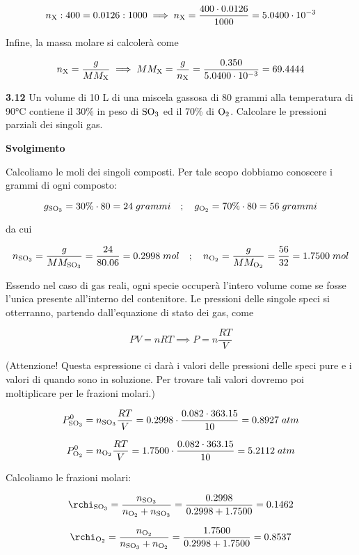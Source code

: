 $$n_{\rm X}:400=0.0126:1000
\implies
n_{\rm X}=\frac{400 \cdot 0.0126}{1000}
=5.0400 \cdot 10^{-3}$$

Infine, la massa molare si calcolerà come

$$n_{\rm X}=\frac{g}{MM_{\rm X}}
\implies
MM_{\rm X}=\frac{g}{n_{\rm X}}=\frac{0.350}{5.0400 \cdot 10^{-3}}=69.4444$$

\vspace{0.2cm}\textbf{3.12} Un volume di 10 L di una miscela gassosa di 80 grammi alla temperatura di 90°C contiene il
30\% in peso di $\rm SO_3$ ed il 70\% di $\rm O_2$. Calcolare le pressioni parziali dei singoli gas.

\vspace{0.2cm}\large\textbf{Svolgimento}\normalsize

\vspace{0.2cm}Calcoliamo le moli dei singoli composti. Per tale scopo dobbiamo conoscere i grammi di ogni composto:

$$g_{\rm SO_3}=30\% \cdot 80=24\;grammi
\quad;\quad
g_{\rm O_2}=70\% \cdot 80=56\;grammi$$

da cui

\vspace{-0.2cm}$$n_{\rm SO_3}=\frac{g}{MM_{\rm SO_3}}=\frac{24}{80.06}=0.2998\;mol
\quad;\quad
n_{\rm O_2}=\frac{g}{MM_{\rm O_2}}=\frac{56}{32}=1.7500\;mol$$

Essendo nel caso di gas reali, ogni specie occuperà l'intero volume come se fosse l'unica presente all'interno del contenitore. Le pressioni delle singole speci si otterranno, partendo dall'equazione di stato dei gas, come

$$PV=nRT \implies
P=n\frac{RT}{V}$$

(Attenzione! Questa espressione ci darà i valori delle pressioni delle speci pure e i valori di quando sono in soluzione. Per trovare tali valori dovremo poi moltiplicare per le frazioni molari.)

$$P^0_{\rm SO_3}=n_{\rm SO_3} \displaystyle \frac{RT}{V}
=0.2998 \cdot \frac{0.082 \cdot 363.15}{10}
=0.8927\;atm$$

$$P^0_{\rm O_2}=n_{\rm O_2} \displaystyle \frac{RT}{V}
=1.7500 \cdot \frac{0.082 \cdot 363.15}{10}
=5.2112\;atm$$

Calcoliamo le frazioni molari:

$$\rchi_{\rm SO_3}=\frac{n_{\rm SO_3}}{n_{\rm O_2} + n_{\rm SO_3}}=\frac{0.2998}{0.2998 + 1.7500}=0.1462$$

$$\rchi_{\rm O_2}=\frac{n_{\rm O_2}}{n_{\rm SO_3} + n_{\rm O_2}}=\frac{1.7500}{0.2998 + 1.7500}=0.8537$$

